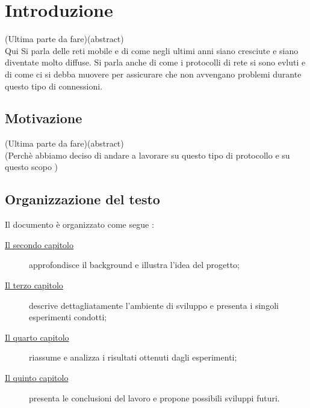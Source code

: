 \chapter{Introduzione}
\label{cap:introduzione}

(Ultima parte da fare)(abstract)\\
Qui Si parla delle reti mobile e di come negli ultimi anni siano cresciute e siano diventate molto diffuse. Si parla anche di come i protocolli di rete si sono evluti e di come ci si debba muovere per assicurare che non avvengano problemi durante questo tipo di connessioni. 


\section{Motivazione}
(Ultima parte da fare)(abstract)\\
(Perchè abbiamo deciso di andare a lavorare su questo tipo di protocollo e su questo scopo )
\section{Organizzazione del testo}

\indent Il documento è organizzato come segue :
\begin{description}
    \item[{\hyperref[cap:descrizione]{Il secondo capitolo}}] approfondisce il background e illustra l'idea del progetto;
    
    \item[{\hyperref[cap:processi-metodologie]{Il terzo capitolo}}] descrive dettagliatamente l'ambiente di sviluppo e presenta i singoli esperimenti condotti;

    \item[{\hyperref[cap:risultati]{Il quarto capitolo}}] riassume e analizza i risultati ottenuti dagli esperimenti;
    
    \item[{\hyperref[cap:conclusioni]{Il quinto capitolo}}] presenta le conclusioni del lavoro e propone possibili sviluppi futuri.
\end{description}

